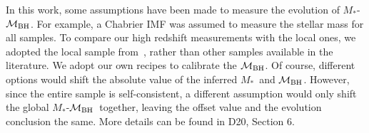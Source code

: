 \documentclass[fleqn,usenatbib]{mnras}
\newcommand{\mbh}{$\mathcal M_{\rm BH}$}
\newcommand{\mstar}{{$M_*$}}
\begin{document}
{In this work, some assumptions have been made to measure the evolution of \mstar-\mbh. For example, a Chabrier IMF was assumed to measure the stellar mass for all samples. To compare our high redshift measurements with the local ones, we adopted the local sample from~\citet{Bennert++2011, H+R04}, rather than other samples available in the literature. We adopt our own recipes to calibrate the \mbh. Of course, different options would shift the absolute value of the inferred \mstar\ and \mbh. However, since the entire sample is self-consistent, a different assumption would only shift the global \mstar-\mbh\ together, leaving the offset value and the evolution conclusion the same. More details can be found in D20, Section 6.

}



\bsp	%
\label{lastpage}
\end{document}
